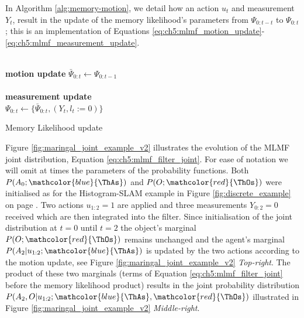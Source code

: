 
In Algorithm \ref{alg:memory-motion}, we detail how an action $u_t$ and measurement $Y_t$, result in the update of
the memory likelihood's parameters from $\Psi_{0:t-t}$ to $\Psi_{0:t}$; this is an implementation of 
Equations \ref{eq:ch5:mlmf_motion_update}-\ref{eq:ch5:mlmf_measurement_update}.

\begin{center}
\begin{minipage}{.65\linewidth}

\begin{algorithm}[H]
\label{alg:memory-motion}

\BlankLine
\nonl\hrulefill\\
\nonl\textbf{motion update} $\bar{\Psi}_{0:t} \gets \Psi_{0:t-1}$ \label{alg:ch5:motion_memory}\\
\nonl\hrulefill\\
\nonl\textbf{measurement update}\\
$\Psi_{0:t} \gets \{\bar{\Psi}_{0:t}, (Y_t,l_t:=0)\}$ 
\caption{Memory Likelihood update}

\end{algorithm} 
\end{minipage}
\end{center}

Figure \ref{fig:maringal_joint_example_v2} illustrates the evolution of the MLMF joint distribution, Equation  \ref{eq:ch5:mlmf_filter_joint}.
For ease of notation we will omit at times the parameters of the probability functions.
Both $P(A_0;\mathcolor{blue}{\ThAs})$ and $P(O;\mathcolor{red}{\ThOs})$ were initialised as for the Histogram-SLAM example in Figure \ref{fig:discrete_example} on page \pageref{fig:discrete_example}.
Two actions $u_{1:2}=1$ are applied and three measurements $Y_{0:2} = 0$ received which are then integrated into the filter. 
Since initialisation of the joint distribution at $t=0$ until $t=2$ the object's marginal $P(O;\mathcolor{red}{\ThOs})$ remains unchanged and the agent's 
marginal $P(A_2|u_{1:2};\mathcolor{blue}{\ThAs})$ is updated by the two actions according to the motion update, see 
Figure \ref{fig:maringal_joint_example_v2} \textit{Top-right}.
The product of these two marginals (terms of Equation \ref{eq:ch5:mlmf_filter_joint} before the memory likelihood product) results in the joint
probability distribution $P(A_2,O|u_{1:2};\mathcolor{blue}{\ThAs},\mathcolor{red}{\ThOs})$ illustrated in 
Figure \ref{fig:maringal_joint_example_v2} \textit{Middle-right}. 




